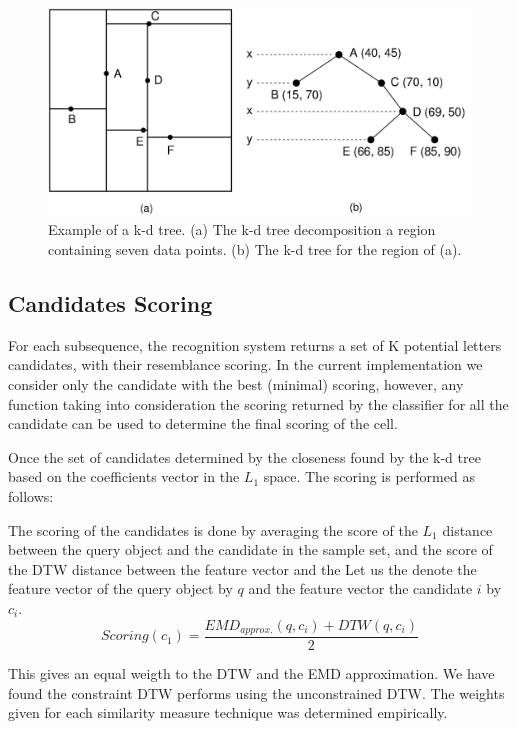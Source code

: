 \documentclass[10pt, conference, compsocconf]{IEEEtran}
\theoremstyle{definition}
\begin{document}
\begin{figure}
\centering
\includegraphics[width=0.7\columnwidth]{./figures/kd_tree}       
\caption{Example of a k-d tree. (a) The k-d tree decomposition  a region containing seven data points. (b) The k-d tree for the region of (a).}
\label{fig:kd_tree}
\end{figure}


\subsection{Candidates Scoring}
For each subsequence, the recognition system returns a set of K potential letters candidates, with their resemblance scoring. 
In the current implementation we consider only the candidate with the best (minimal) scoring, however, any function taking into consideration the scoring returned by the classifier for all the candidate can be used to determine the final scoring of the cell.

Once the set of candidates determined by the closeness found by the k-d tree based on the coefficients vector in the $L_1$ space. The scoring is performed as follows:

The scoring of the candidates is done by averaging the score of the $L_1$ distance between the query object and the candidate in the sample set, and the score of the DTW distance between the feature vector and the 
Let us the denote the feature vector of the query object by $q$ and the feature vector the candidate $i$ by $c_i$.
\begin{equation}
Scoring(c_1)=\frac{EMD_{approx.}(q,c_i)+DTW(q,c_i)}{2} 
\end{equation}

This gives an equal weigth to the DTW and the EMD approximation.
We have found the constraint DTW performs using the unconstrained DTW.
The weights given for each similarity measure technique was determined empirically.
\end{document}
